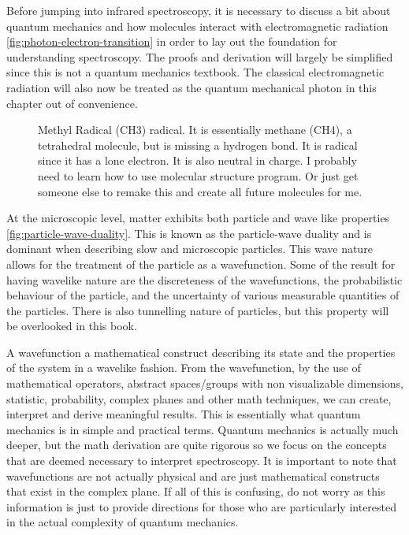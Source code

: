 \documentclass[11pt,a4paper]{book}
\newcommand{\imginput}[1]{} %
\begin{document}
	Before jumping into infrared spectroscopy, it is necessary to discuss a bit about quantum mechanics and how molecules interact with electromagnetic radiation \autoref{fig:photon-electron-transition} in order to lay out the foundation for understanding spectroscopy. The proofs and derivation will largely be simplified since this is not a quantum mechanics textbook. The classical electromagnetic radiation will also now be treated as the quantum mechanical photon in this chapter out of convenience. 
	
	\begin{figure} [!ht]
		\centering
		\huge
		\def\svgwidth{\columnwidth}
		\resizebox{10cm}{!}{\imginput{images/methyl-radical.pdf_tex}}
		\caption{{Methyl Radical (CH3) radical. It is essentially methane (CH4), a tetrahedral molecule, but is missing a hydrogen bond. It is radical since it has a lone electron. It is also neutral in charge. I probably need to learn how to use molecular structure program. Or just get someone else to remake this and create all future molecules for me.}}
		\label{fig:methyl-radical}
	\end{figure}
		
	At the microscopic level, matter exhibits both particle and wave like properties \autoref{fig:particle-wave-duality}. This is known as the particle-wave duality and is dominant when describing slow and microscopic particles. This wave nature allows for the treatment of the particle as a wavefunction. Some of the result for having wavelike nature are the discreteness of the wavefunctions, the probabilistic behaviour of the particle, and the uncertainty of various measurable quantities of the particles. There is also tunnelling nature of particles, but this property will be overlooked in this book. 
	
	A wavefunction a mathematical construct describing its state and the properties of the system in a wavelike fashion. From the wavefunction, by the use of mathematical operators, abstract spaces/groups with non visualizable dimensions, statistic, probability, complex planes and other math techniques, we can create, interpret and derive meaningful results. This is essentially what quantum mechanics is in simple and practical terms. Quantum mechanics is actually much deeper, but the math derivation are quite rigorous so we focus on the concepts that are deemed necessary to interpret spectroscopy. It is important to note that wavefunctions are not actually physical and are just mathematical constructs that exist in the complex plane. If all of this is confusing, do not worry as this information is just to provide directions for those who are particularly interested in the actual complexity of quantum mechanics.
	
\end{document}
